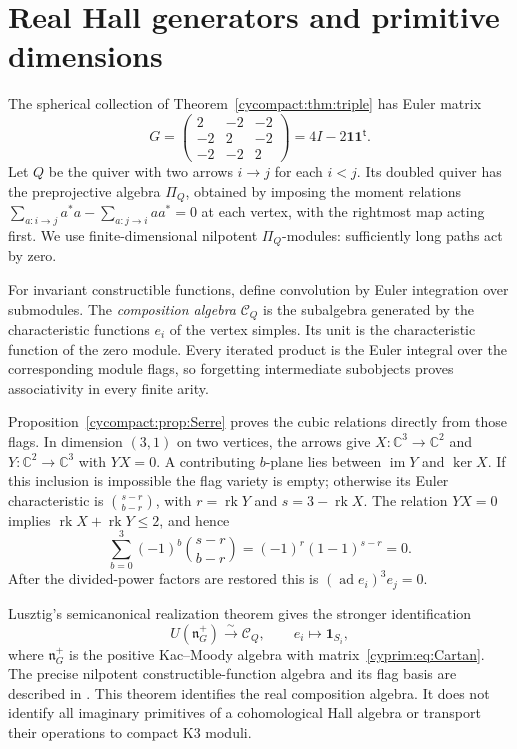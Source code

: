 \section{Real Hall generators and primitive dimensions}
\label{cyprim:sec:real}

The spherical collection of Theorem~\ref{cycompact:thm:triple}
has Euler matrix
\begin{equation}\label{cyprim:eq:Cartan}
 G=\begin{pmatrix}2&-2&-2\\-2&2&-2\\-2&-2&2\end{pmatrix}
   =4I-2\mathbf1\mathbf1^{\mathsf t}.
\end{equation}
Let $Q$ be the quiver with two arrows $i\to j$ for each $i<j$.
Its doubled quiver has the preprojective algebra $\Pi_Q$,
obtained by imposing the moment relations
$\sum_{a:i\to j}a^*a-\sum_{a:j\to i}aa^*=0$ at each vertex,
with the rightmost map acting first. We use
finite-dimensional nilpotent $\Pi_Q$-modules: sufficiently
long paths act by zero.

For invariant constructible functions, define convolution by
Euler integration over submodules. The \emph{composition algebra}
$\mathcal C_Q$ is the subalgebra generated by the characteristic
functions $e_i$ of the vertex simples. Its unit is the
characteristic function of the zero module. Every iterated
product is the Euler integral over the corresponding module
flags, so forgetting intermediate subobjects proves associativity
in every finite arity.

Proposition~\ref{cycompact:prop:Serre} proves the cubic relations
directly from those flags. In dimension $(3,1)$ on two vertices,
the arrows give $X:\mathbb C^3\to\mathbb C^2$ and
$Y:\mathbb C^2\to\mathbb C^3$ with $YX=0$. A contributing
$b$-plane lies between $\operatorname{im}Y$ and $\ker X$.
If this inclusion is impossible the flag variety is empty;
otherwise its Euler characteristic is
$\binom{s-r}{b-r}$, with $r=\operatorname{rk}Y$ and
$s=3-\operatorname{rk}X$. The relation $YX=0$ implies
$\operatorname{rk}X+\operatorname{rk}Y\le2$, and hence
\[
 \sum_{b=0}^3(-1)^b\binom{s-r}{b-r}
       =(-1)^r(1-1)^{s-r}=0.
\]
After the divided-power factors are restored this is
$(\operatorname{ad}e_i)^3e_j=0$.

Lusztig's semicanonical realization theorem gives the stronger
identification
\begin{equation}\label{cyprim:eq:composition}
 U(\mathfrak n_G^+)\xrightarrow{\sim}\mathcal C_Q,
 \qquad e_i\longmapsto\mathbf1_{S_i},
\end{equation}
where $\mathfrak n_G^+$ is the positive Kac--Moody algebra
with matrix~\eqref{cyprim:eq:Cartan}. The precise nilpotent
constructible-function algebra and its flag basis are described
in \cite[\S\S~1.1,~2.1]{rewriteGLS2007}.
This theorem identifies the real composition algebra. It does
not identify all imaginary primitives of a cohomological Hall
algebra or transport their operations to compact K3 moduli.

